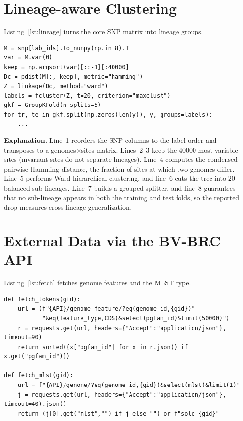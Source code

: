 \documentclass[../main.tex]{subfiles}
\begin{document}
\section{Lineage-aware Clustering}

Listing~\ref{lst:lineage} turns the core SNP matrix into lineage groups.

\begin{lstlisting}[caption={Core-SNP distance and Ward clustering.},label=lst:lineage]
M = snp[lab_ids].to_numpy(np.int8).T
var = M.var(0)
keep = np.argsort(var)[::-1][:40000]
Dc = pdist(M[:, keep], metric="hamming")
Z = linkage(Dc, method="ward")
labels = fcluster(Z, t=20, criterion="maxclust")
gkf = GroupKFold(n_splits=5)
for tr, te in gkf.split(np.zeros(len(y)), y, groups=labels):
    ...
\end{lstlisting}

\noindent\textbf{Explanation.} Line~1 reorders the SNP columns to the label order and transposes to a genomes$\times$sites matrix. Lines~2--3 keep the $40000$ most variable sites (invariant sites do not separate lineages). Line~4 computes the condensed pairwise Hamming distance, the fraction of sites at which two genomes differ. Line~5 performs Ward hierarchical clustering, and line~6 cuts the tree into $20$ balanced sub-lineages. Line~7 builds a grouped splitter, and line~8 guarantees that no sub-lineage appears in both the training and test folds, so the reported drop measures cross-lineage generalization.

\section{External Data via the BV-BRC API}

Listing~\ref{lst:fetch} fetches genome features and the MLST type.

\begin{lstlisting}[caption={Fetching pgfam features and MLST from BV-BRC.},label=lst:fetch]
def fetch_tokens(gid):
    url = (f"{API}/genome_feature/?eq(genome_id,{gid})"
           "&eq(feature_type,CDS)&select(pgfam_id)&limit(50000)")
    r = requests.get(url, headers={"Accept":"application/json"}, timeout=90)
    return sorted({x["pgfam_id"] for x in r.json() if x.get("pgfam_id")})

def fetch_mlst(gid):
    url = f"{API}/genome/?eq(genome_id,{gid})&select(mlst)&limit(1)"
    j = requests.get(url, headers={"Accept":"application/json"}, timeout=40).json()
    return (j[0].get("mlst","") if j else "") or f"solo_{gid}"
\end{lstlisting}
\end{document}
